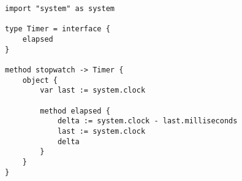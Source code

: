 \begin{lstlisting}[label={code:stopwatch}, caption={A program that defines a method that creates a simple stopwatch object.}]
import "system" as system

type Timer = interface {
    elapsed
}

method stopwatch -> Timer {
    object {
        var last := system.clock

        method elapsed {
            delta := system.clock - last.milliseconds
            last := system.clock
            delta
        }
    }
} 
\end{lstlisting}